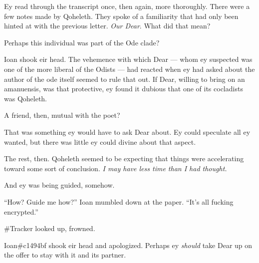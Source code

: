 Ey read through the transcript once, then again, more thoroughly. There were a few notes made by Qoheleth. They spoke of a familiarity that had only been hinted at with the previous letter. \emph{Our Dear}. What did that mean?

Perhaps this individual was part of the Ode clade?

Ioan shook eir head. The vehemence with which Dear --- whom ey suspected was one of the more liberal of the Odists --- had reacted when ey had asked about the author of the ode itself seemed to rule that out. If Dear, willing to bring on an amanuensis, was that protective, ey found it dubious that one of its cocladists was Qoheleth.

A friend, then, mutual with the poet?

That was something ey would have to ask Dear about. Ey could speculate all ey wanted, but there was little ey could divine about that aspect.

The rest, then. Qoheleth seemed to be expecting that things were accelerating toward some sort of conclusion. \emph{I may have less time than I had thought.}

And ey was being guided, somehow.

``How? Guide me how?'' Ioan mumbled down at the paper. ``It's all fucking encrypted.''

\#Tracker looked up, frowned.

Ioan\#c1494bf shook eir head and apologized. Perhaps ey \emph{should} take Dear up on the offer to stay with it and its partner.
